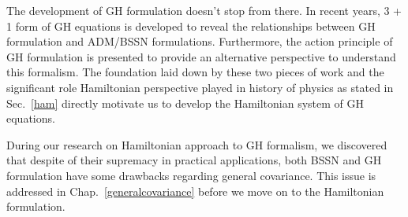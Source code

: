 The development of GH formulation doesn't stop from there. In recent years, 3 + 1 form of GH equations\cite{Brown:2011qg} is developed
to reveal the relationships between GH formulation and ADM/BSSN formulations. Furthermore, the action principle of GH formulation\cite{Brown:2010rya} is presented to provide an alternative perspective to understand this formalism. The foundation laid down by these two pieces of work and the significant role Hamiltonian perspective played in history of physics as stated in Sec.~\ref{ham} directly motivate us to develop the Hamiltonian system of GH equations. 

During our research on Hamiltonian approach to GH formalism, we discovered that despite of their supremacy in practical applications, both BSSN and GH formulation have some drawbacks regarding general covariance. This issue is addressed in Chap.~\ref{generalcovariance} before we move on to the Hamiltonian formulation. 

